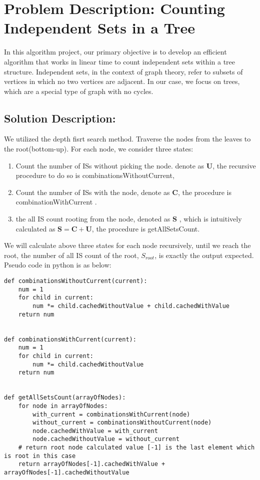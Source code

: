 \documentclass{article}
\begin{document}
\section*{Problem Description: Counting Independent Sets in a Tree}
In this algorithm project, our primary objective is to develop an efficient algorithm that works in linear time to count independent sets within a tree structure. Independent sets, in the context of graph theory, refer to subsets of vertices in which no two vertices are adjacent. In our case, we focus on trees, which are a special type of graph with no cycles.

\subsection*{Solution Description:}
We utilized the depth fisrt search method. Traverse the nodes from the leaves to the root(bottom-up).
For each node,  we consider three states: 
\begin{enumerate}
  \item Count the number of ISs without picking the node. denote as $\bm{U}$, the recursive procedure to do so is combinationsWithoutCurrent,  \item Count the number of ISs with the node, denote as $\bm{C}$, the procedure is combinationWithCurrent . \item the all IS count rooting from the node,  denoted as $\bm{S}$ , which is intuitively calculated as
$\bm{S} = \bm{C} + \bm{U}$, the procedure is getAllSetsCount. 
\end{enumerate}
We will calculate above three states for each node recursively, until we reach the root, the number of all IS count of the root,
$S_{root}$,  is exactly the output expected. Pseudo code in python is as below: 
\newpage
\begin{lstlisting}
def combinationsWithoutCurrent(current):
    num = 1
    for child in current:
        num *= child.cachedWithoutValue + child.cachedWithValue
    return num


def combinationsWithCurrent(current):
    num = 1
    for child in current:
        num *= child.cachedWithoutValue
    return num


def getAllSetsCount(arrayOfNodes):
    for node in arrayOfNodes:
        with_current = combinationsWithCurrent(node)
        without_current = combinationsWithoutCurrent(node)
        node.cachedWithValue = with_current
        node.cachedWithoutValue = without_current
    # return root node calculated value [-1] is the last element which is root in this case
    return arrayOfNodes[-1].cachedWithValue + arrayOfNodes[-1].cachedWithoutValue
\end{lstlisting}
\end{document}
